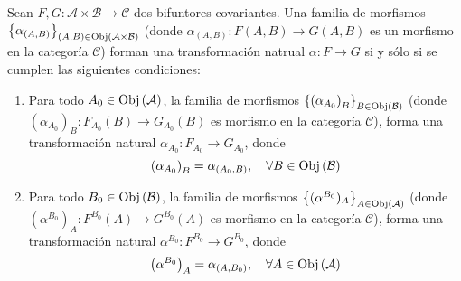\documentclass[12pt]{report}
\newcounter{it}
\theoremstyle{largebreak}
\newcommand\cf[3]{\ensuremath{#1:#2\rightarrow#3}}
\newcommand{\Obj}[1]{\ensuremath{\textup{Obj}\left(#1\right)}}
\begin{document}
    \begin{propo}
        Sean $\cf{F,G}{\mathcal{A}\times\mathcal{B}}{\mathcal{C}}$ dos bifuntores covariantes. Una familia de morfismos $\left\{\alpha_{(A,B)} \right\}_{(A,B)\in\Obj{\mathcal{A}\times\mathcal{B}}}$ (donde $\cf{\alpha_{(A,B)}}{F(A,B)}{G(A,B)}$ es un morfismo en la categoría $\mathcal{C}$) forman una transformación natrual $\cf{\alpha}{F}{G}$ si y sólo si se cumplen las siguientes condiciones:
        \begin{enumerate}
            \item Para todo $A_0\in\Obj{\mathcal{A}}$, la familia de morfismos $\left\{\left(\alpha_{A_0}\right)_B \right\}_{B\in\Obj{\mathcal{B}}}$ (donde $\cf{\left(\alpha_{A_0}\right)_B}{F_{A_0}(B)}{G_{A_0}(B)}$ es morfismo en la categoría $\mathcal{C}$), forma una transformación natural $\cf{\alpha_{ A_0}}{F_{A_0}}{G_{A_0}}$, donde
            \begin{equation*}
                \left(\alpha_{A_0}\right)_B=\alpha_{(A_0,B)},\quad\forall B\in\Obj{\mathcal{B}}
            \end{equation*}
            \item Para todo $B_0\in\Obj{\mathcal{B}}$, la familia de morfismos $\left\{(\alpha^{ B_0})_A \right\}_{ A\in\Obj{\mathcal{A}}}$ (donde $\cf{\left(\alpha^{B_0}\right)_A}{F^{B_0}(A)}{G^{B_0}(A)}$ es morfismo en la categoría $\mathcal{C}$), forma una transformación natural $\cf{\alpha^{ B_0}}{F^{B_0}}{G^{B_0}}$, donde
            \begin{equation*}
                \left(\alpha^{B_0}\right)_A=\alpha_{(A,B_0)},\quad\forall A\in\Obj{\mathcal{A}}
            \end{equation*}
        \end{enumerate}
    \end{propo}
\end{document}
